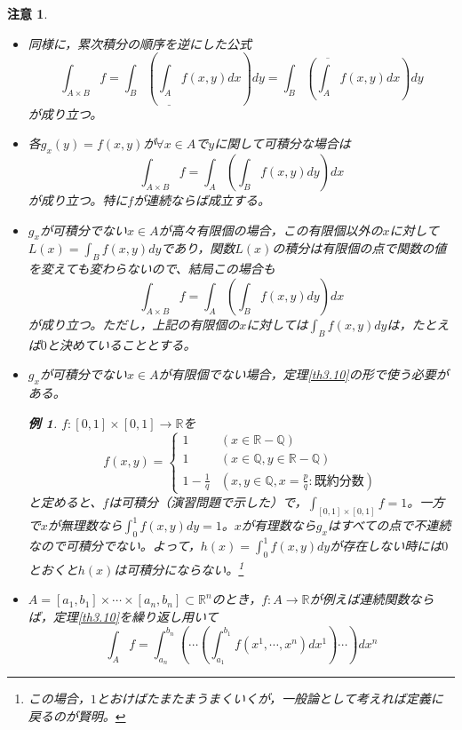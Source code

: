\documentclass[dvipdfmx,a4j,10pt]{jsarticle}
\theoremstyle{mystyle1}
\theoremstyle{mystyle2}
\newtheorem{example}{例}
\newtheorem{note}{注意}
\begin{document}
\newpage

\begin{note}\
	\begin{itemize}
			\item 同様に，累次積分の順序を逆にした公式
			\[
			\int_{A\times B}f=\int_B\left(\underline{\int_A}f(x,y)dx\right)dy=\int_B\left(\overline{\int_A}f(x,y)dx\right)dy
			\]
			が成り立つ。
			\item 各$g_x(y)=f(x,y)$が$\forall x\in A$で$y$に関して可積分な場合は
			\[
			\int_{A\times B}f=\int_A\left(\int_B f(x,y)dy\right)dx
			\]
			が成り立つ。特に$f$が連続ならば成立する。
			\item $g_x$が可積分でない$x\in A$が高々有限個の場合，この有限個以外の$x$に対して$\displaystyle L(x)=\int_B f(x,y)dy$であり，関数$L(x)$の積分は有限個の点で関数の値を変えても変わらないので、結局この場合も
			\[
			\int_{A\times B}f=\int_A\left(\int_B f(x,y)dy\right)dx
			\]
			が成り立つ。ただし，上記の有限個の$x$に対しては$\displaystyle \int_B f(x,y)dy$は，たとえば$0$と決めていることとする。
			\item $g_x$が可積分でない$x\in A$が有限個でない場合，定理\ref{th3.10}の形で使う必要がある。
			\begin{example}
				$f:[0,1]\times [0,1]\to\mathbb{R}$を
				\[
				f(x,y)=
				\begin{cases}
					1 & (x\in\mathbb{R}-\mathbb{Q})\\
					1 & (x\in\mathbb{Q},y\in\mathbb{R}-\mathbb{Q})\\
					1-\frac{1}{q} & (x,y\in\mathbb{Q},x=\frac{p}{q}:既約分数)
				\end{cases}
				\]
				と定めると、$f$は可積分（演習問題で示した）で，$\displaystyle \int_{[0,1]\times[0,1]}f=1$。一方で$x$が無理数なら$\displaystyle \int_0^1 f(x,y)dy=1$。$x$が有理数なら$g_x$はすべての点で不連続なので可積分でない。よって，$\displaystyle h(x)=\int_0^1 f(x,y)dy$が存在しない時には$0$とおくと$h(x)$は可積分にならない。\footnote{この場合，$1$とおけばたまたまうまくいくが，一般論として考えれば定義に戻るのが賢明。}
			\end{example}
			\item $A=[a_1,b_1]\times\cdots\times[a_n,b_n]\subset\mathbb{R}^n$のとき，$f:A\to\mathbb{R}$が例えば連続関数ならば，定理\ref{th3.10}を繰り返し用いて
			\[
			\int_A f = \int_{a_n}^{b_n}\left(\cdots\left(\int_{a_1}^{b_1}f(x^1,\cdots,x^n)dx^1\right)\cdots\right)dx^n
			\]
	\end{itemize}
\end{note}


\newpage
\end{document}
